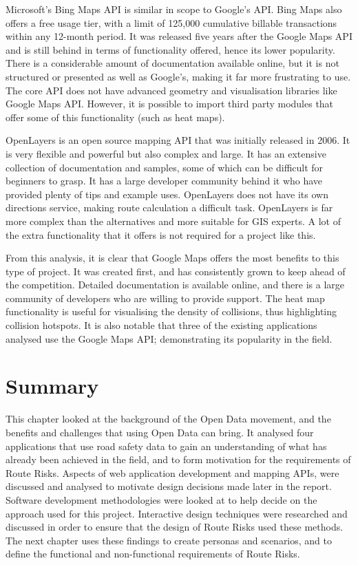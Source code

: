 \documentclass[authoryearcitations]{UoYCSproject}
\begin{document}
Microsoft's Bing Maps API \citep{Microsoft} is similar in scope to Google's API. Bing Maps also offers a free usage tier, with a limit of 125,000 cumulative billable transactions within any 12-month period. It was released five years after the Google Maps API and is still behind in terms of functionality offered, hence its lower popularity. There is a considerable amount of documentation available online, but it is not structured or presented as well as Google's, making it far more frustrating to use. The core API does not have advanced geometry and visualisation libraries like Google Maps API. However, it is possible to import third party modules that offer some of this functionality (such as heat maps). 

OpenLayers \citep{OpenLayers} is an open source mapping API that was initially released in 2006. It is very flexible and powerful but also complex and large. It has an extensive collection of documentation and samples, some of which can be difficult for beginners to grasp. It has a large developer community behind it who have provided plenty of tips and example uses. OpenLayers does not have its own directions service, making route calculation a difficult task. OpenLayers is far more complex than the alternatives and more suitable for GIS experts. A lot of the extra functionality that it offers is not required for a project like this.

From this analysis, it is clear that Google Maps offers the most benefits to this type of project. It was created first, and has consistently grown to keep ahead of the competition. Detailed documentation is available online, and there is a large community of developers who are willing to provide support. The heat map functionality is useful for visualising the density of collisions, thus highlighting collision hotspots. It is also notable that three of the existing applications analysed use the Google Maps API; demonstrating its popularity in the field.

\section{Summary}
This chapter looked at the background of the Open Data movement, and the benefits and challenges that using Open Data can bring. It analysed four applications that use road safety data to gain an understanding of what has already been achieved in the field, and to form motivation for the requirements of Route Risks. Aspects of web application development and mapping APIs, were discussed and analysed to motivate design decisions made later in the report. Software development methodologies were looked at to help decide on the approach used for this project. Interactive design techniques were researched and discussed in order to ensure that the design of  Route Risks used these methods. The next chapter uses these findings to create personas and scenarios, and to define the functional and non-functional requirements of Route Risks.
\end{document}
